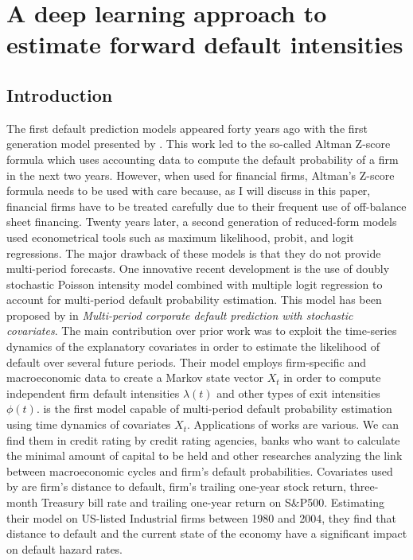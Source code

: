 \chapter{A deep learning approach to estimate forward default intensities}

\section{Introduction}
\label{S:1}
The first default prediction models appeared forty years ago with the first generation model presented by \citet{altman}. This work led to the so-called Altman Z-score formula which uses accounting data to compute the default probability of a firm in the next two years. However, when used for financial firms, Altman's Z-score formula needs to be used with care  because, as I will discuss in this paper, financial firms have to be treated carefully due to their frequent use of off-balance sheet financing. Twenty years later, a second generation of reduced-form models used econometrical tools such as maximum likelihood, probit, and logit regressions. The major drawback of these models is that they do not provide multi-period forecasts. One innovative recent development is the use of doubly stochastic Poisson intensity model combined with multiple logit regression to account for multi-period default probability estimation. This model has been proposed by \citet{DSW} in \textit{Multi-period corporate default prediction with stochastic covariates}. The main contribution over prior work was to exploit the time-series dynamics of the explanatory covariates in order to estimate the likelihood of default over several future periods. Their model employs firm-specific and macroeconomic data to create a Markov state vector $X_t$ in order to compute independent firm default intensities $\lambda(t)$ and other types of exit intensities $\phi(t)$.
\citet{DSW} is the first model capable of multi-period default probability estimation using time dynamics of covariates $X_t$. Applications of \citet{DSW} works are various. We can find them in credit rating by credit rating agencies, banks who want to calculate the minimal amount of capital to be held and other researches analyzing the link between macroeconomic cycles and firm's default probabilities. Covariates used by \citet{DSW} are firm's distance to default, firm's trailing one-year stock return, three-month Treasury bill rate and trailing one-year return on S\&P500. Estimating their model on US-listed Industrial firms between 1980 and 2004, they find that distance to default and the current state of the economy have a significant impact on default hazard rates.

